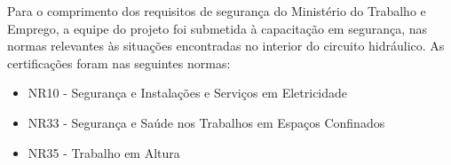 Para o comprimento dos requisitos de segurança do Ministério do Trabalho e
Emprego, a equipe do projeto foi submetida à capacitação em segurança, nas
normas relevantes às situações encontradas no interior do circuito hidráulico. As certificações foram nas
seguintes normas:

\begin{itemize}
  \item NR10 - Segurança e Instalações e Serviços em Eletricidade
  \item NR33 - Segurança e Saúde nos Trabalhos em Espaços Confinados
  \item NR35 - Trabalho em Altura
\end{itemize}




